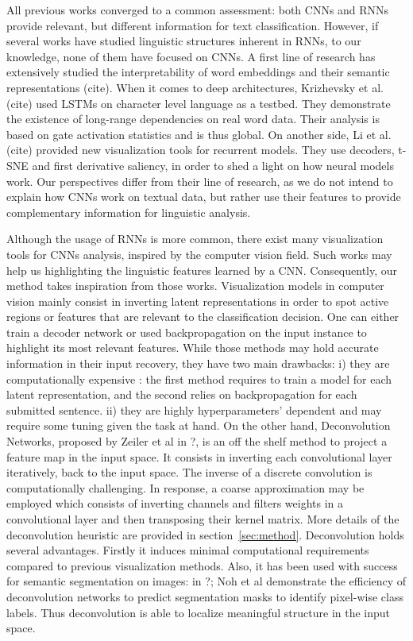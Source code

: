  All previous works converged to a common assessment: both CNNs and RNNs provide relevant, but different information for text classification. 
 However, if several works have studied linguistic structures inherent in RNNs, to our knowledge, none of them have focused on CNNs. 
 A first line of research has extensively studied the interpretability of word embeddings and their semantic representations (cite). 
 When it comes to deep architectures, Krizhevsky et al. (cite) used LSTMs on character level language as a testbed. They demonstrate the existence of 
 long-range dependencies on real word data. Their analysis is based on gate activation statistics and is thus global. On another side, Li et al. (cite)
 provided new visualization tools for recurrent models. They use decoders, t-SNE and first derivative saliency, in order to shed a light on how neural models work.
Our perspectives differ from their line of research, as we do not intend to explain how CNNs work on textual data, but rather use their features 
to provide complementary information for linguistic analysis.

Although the usage of RNNs is more common, there exist many visualization tools for CNNs analysis, 
inspired by the computer vision field. Such works may help us highlighting the linguistic features learned by a 
CNN. Consequently, our method takes inspiration from those works. Visualization models in computer vision mainly consist 
in inverting latent representations in order to spot active regions or features that are relevant to the classification decision.
One can either train a decoder network or used backpropagation on the input instance to highlight its most relevant features. 
While those methods may hold accurate information in their input recovery, they have two main drawbacks: 
i) they are computationally expensive : the first method requires to train a model for each latent representation, and the second relies 
on backpropagation for each submitted sentence. ii) they are highly hyperparameters’ dependent and may require some tuning given the task at hand.
On the other hand, Deconvolution Networks, proposed by Zeiler et al in ?, is an off the shelf method to project a feature map in the input 
space. It consists in inverting each convolutional layer iteratively, back to the input space. The inverse of a discrete convolution is 
computationally challenging. In response, a coarse approximation may be employed which consists of inverting channels and filters weights 
in a convolutional layer and then transposing their kernel matrix. More details of the deconvolution heuristic are provided in section~\ref{sec:method}.
Deconvolution holds several advantages. Firstly it induces minimal computational requirements compared to previous visualization methods. 
Also, it has been used with success for semantic segmentation on images: in ?; Noh et al demonstrate the efficiency of deconvolution networks 
to predict segmentation masks to identify pixel-wise class labels. Thus deconvolution is able to localize meaningful structure in the input space.
